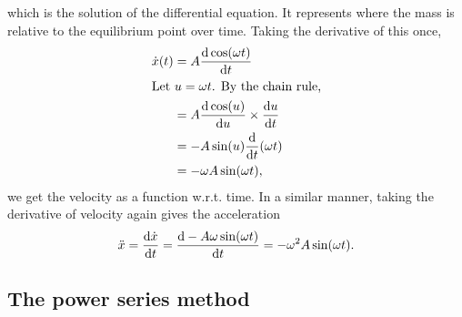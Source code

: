 which is the solution of the differential equation. It represents where the mass is relative to the equilibrium point over time. Taking the derivative of this once,
\begin{align}
	\dot{x}(t) &= A\odv{\cos(\omega t)}{t} \\
	\intertext{Let $u = \omega t$. By the chain rule,}
			&= A\odv{\cos(u)}{u} \times \odv{u}{t} \\
			&= -A\sin(u) \odv*{(\omega t)}{t} \\
			&= -\omega A\sin(\omega t), \label{eq:harmonic-oscillator-velocity}
\end{align}
we get the velocity as a function w.r.t. time. In a similar manner, taking the derivative of velocity again gives the acceleration
\begin{equation}
	\ddot{x} = \odv{\dot{x}}{t} = \odv{-A\omega\sin(\omega t)}{t} = -\omega^2A\sin(\omega t). \label{eq:harmonic-oscillator-acceleration}
\end{equation}

\subsection{The power series method}

